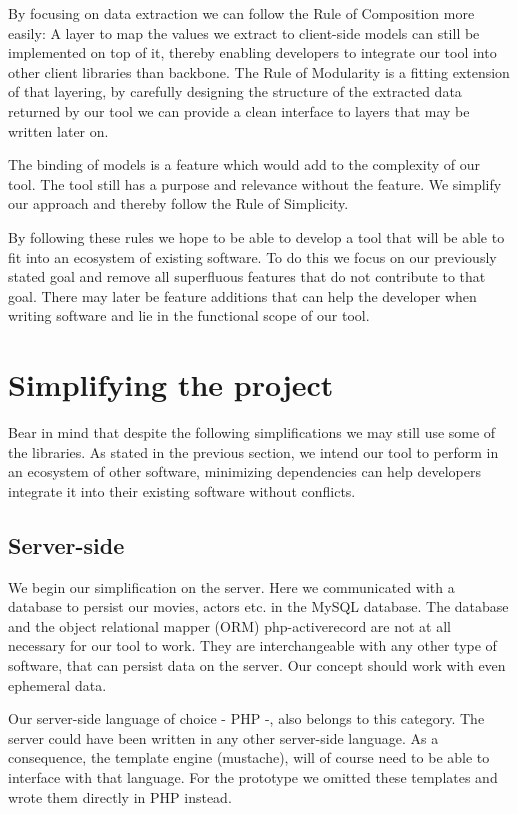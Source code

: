 \documentclass[thesis.tex]{subfiles}
\begin{document}
By focusing on data extraction we can follow the Rule of Composition more
easily: A layer to map the values we extract to client-side models can still be
implemented on top of it, thereby enabling developers to integrate our tool into
other client libraries than backbone.
The Rule of Modularity is a fitting extension of that layering, by carefully
designing the structure of the extracted data returned by our tool we can
provide a clean interface to layers that may be written later on.

The binding of models is a feature which would add to the complexity of our
tool. The tool still has a purpose and relevance without the feature.
We simplify our approach and thereby follow the Rule of Simplicity.

By following these rules we hope to be able to develop a tool that will be able
to fit into an ecosystem of existing software. To do this we focus on our
previously stated goal and remove all superfluous features that do not
contribute to that goal. There may later be feature additions that can help the
developer when writing software and lie in the functional scope of our tool.

\section{Simplifying the project}

Bear in mind that despite the following simplifications we may still use some
of the libraries.
As stated in the previous section, we intend our tool to perform in an ecosystem
of other software, minimizing dependencies can help developers integrate it into
their existing software without conflicts.

\subsection{Server-side}
We begin our simplification on the server. Here we communicated with a database
to persist our movies, actors etc. in the MySQL database. The database and the
object relational mapper (ORM) php-activerecord are not at all necessary for our
tool to work. They are interchangeable with any other type of software, that can
persist data on the server. Our concept should work with even ephemeral data.

Our server-side language of choice - PHP -, also belongs to this category.
The server could have been written in any other server-side language.
As a consequence, the template engine (mustache), will of course need to be
able to interface with that language. For the prototype we omitted these
templates and wrote them directly in PHP instead.
\end{document}
